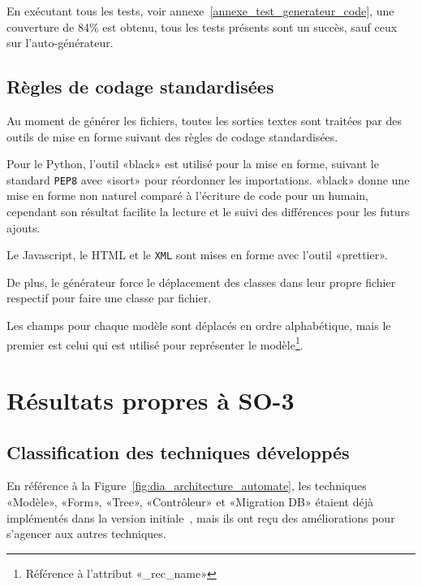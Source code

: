En exécutant tous les tests, voir annexe~\ref{annexe_test_generateur_code}, une couverture de 84\% est obtenu, tous les tests présents sont un succès, sauf ceux sur l’auto-générateur.

\subsection {Règles de codage standardisées}

Au moment de générer les fichiers, toutes les sorties textes sont traitées par des outils de mise en forme suivant des règles de codage standardisées.

Pour le Python, l’outil «black» est utilisé pour la mise en forme, suivant le standard \texttt{PEP8} avec «isort» pour réordonner les importations. «black» donne une mise en forme non naturel comparé à l’écriture de code pour un humain, cependant son résultat facilite la lecture et le suivi des différences pour les futurs ajouts.

Le Javascript, le HTML et le \texttt{XML} sont mises en forme avec l’outil «prettier».

De plus, le générateur force le déplacement des classes dans leur propre fichier respectif pour faire une classe par fichier.

Les champs pour chaque modèle sont déplacés en ordre alphabétique, mais le premier est celui qui est utilisé pour représenter le modèle\footnote{Référence à l'attribut «\_rec\_name»}.

\section{Résultats propres à SO-3}

\subsection{Classification des techniques développés}

En référence à la Figure~\ref{fig:dia_architecture_automate}, les techniques «Modèle», «Form», «Tree», «Contrôleur» et «Migration DB» étaient déjà implémentés dans la version initiale~\cite{bluiksnot_repo}, mais ils ont reçu des améliorations pour s’agencer aux autres techniques.

